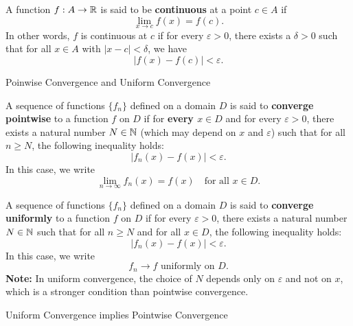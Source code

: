 \documentclass[12pt, a4paper]{article}
\begin{document}
\vspace{30pt}

\begin{definition}
    A function $f:A\to\mathbb{R}$ is said to be \textbf{continuous} at a point $c \in A$ if
\[
\lim_{x \to c} f(x) = f(c).
\]
In other words, $f$ is continuous at $c$ if for every $\varepsilon > 0$, there exists a $\delta > 0$ such that for all $x \in A$ with $|x - c| < \delta$, we have
\[
|f(x) - f(c)| < \varepsilon.
\]
\end{definition}

\clearpage

\begin{heading}
    Poinwise Convergence and Uniform Convergence
\end{heading}

\vspace{10pt}

\begin{definition}
    A sequence of functions $\{f_n\}$ defined on a domain $D$ is said to \textbf{converge pointwise} to a function $f$ on $D$ if for \textbf{every $x \in D$} and for every $\varepsilon > 0$, there exists a natural number $N \in \mathbb{N}$ (which may depend on $x$ and $\varepsilon$) such that for all $n \geq N$, the following inequality holds:
    \[
    |f_n(x) - f(x)| < \varepsilon.
    \]
    In this case, we write
    \[
    \lim_{n \to \infty} f_n(x) = f(x) \quad \text{for all } x \in D.
    \] 
\end{definition}

\vspace{10pt}

\begin{definition}
    A sequence of functions $\{f_n\}$ defined on a domain $D$ is said to \textbf{converge uniformly} to a function $f$ on $D$ if for every $\varepsilon > 0$, there exists a natural number $N \in \mathbb{N}$ such that for all $n \geq N$ and for all $x \in D$, the following inequality holds:
    \[
    |f_n(x) - f(x)| < \varepsilon.
    \]
    In this case, we write
    \[
    f_n \to f \text{ uniformly on } D.
    \]
    \textbf{Note:} In uniform convergence, the choice of $N$ depends only on $\varepsilon$ and not on $x$, which is a stronger condition than pointwise convergence.
\end{definition}

\clearpage

\begin{heading}
    Uniform Convergence implies Pointwise Convergence
\end{heading}
\end{document}
